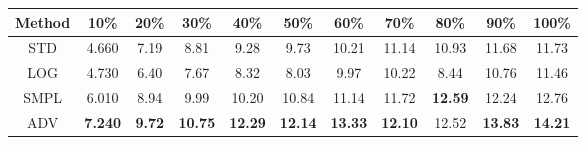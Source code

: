 \documentclass{standalone}
\begin{document}
\begin{tabular}{c|cccccccccc}
      \toprule
      Method & 10\% & 20\% & 30\% & 40\% & 50\% & 60\% & 70\% & 80\% & 90\% & 100\% \\
      \midrule
STD & 4.660 & 7.19 & 8.81 & 9.28 & 9.73 & 10.21 & 11.14 & 10.93 & 11.68 & 11.73\\
LOG & 4.730 & 6.40 & 7.67 & 8.32 & 8.03 & 9.97 & 10.22 & 8.44 & 10.76 & 11.46\\
SMPL & 6.010 & 8.94 & 9.99 & 10.20 & 10.84 & 11.14 & 11.72 & \textbf{12.59} & 12.24 & 12.76\\
ADV & \textbf{7.240} & \textbf{9.72} & \textbf{10.75} & \textbf{12.29} & \textbf{12.14} & \textbf{13.33} & \textbf{12.10} & 12.52 & \textbf{13.83} & \textbf{14.21}\\
  \bottomrule
\end{tabular}
\end{document}
